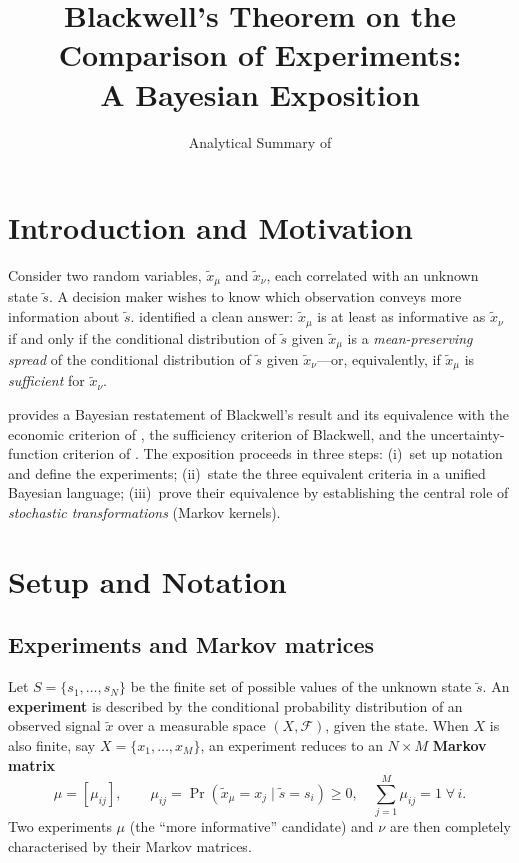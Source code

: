 \documentclass[12pt]{article}
\title{Blackwell's Theorem on the Comparison of Experiments:\\
       A Bayesian Exposition}
\author{Analytical Summary of \citet{kihlstrom1984}}
\date{}
\begin{document}
\maketitle
\tableofcontents
\bigskip

\section{Introduction and Motivation}

Consider two random variables, $\tilde{x}_\mu$ and $\tilde{x}_\nu$, each correlated
with an unknown state $\tilde{s}$.  A decision maker wishes to know which observation
conveys more information about $\tilde{s}$.  \citet{blackwell1951,blackwell1953}
identified a clean answer: $\tilde{x}_\mu$ is at least as informative as
$\tilde{x}_\nu$ if and only if the conditional distribution of $\tilde{s}$ given
$\tilde{x}_\mu$ is a \emph{mean-preserving spread} of the conditional distribution
of $\tilde{s}$ given $\tilde{x}_\nu$---or, equivalently, if $\tilde{x}_\mu$ is
\emph{sufficient} for $\tilde{x}_\nu$.

\citet{kihlstrom1984} provides a Bayesian restatement of Blackwell's result and
its equivalence with the economic criterion of \citet{bonnenblust1949}, the
sufficiency criterion of Blackwell, and the uncertainty-function criterion of
\citet{degroot1962}.  The exposition proceeds in three steps: (i)~set up notation
and define the experiments; (ii)~state the three equivalent criteria in a unified
Bayesian language; (iii)~prove their equivalence by establishing the central role
of \emph{stochastic transformations} (Markov kernels).

\section{Setup and Notation}

\subsection{Experiments and Markov matrices}

Let $S = \{s_1, \ldots, s_N\}$ be the finite set of possible values of the
unknown state $\tilde{s}$.  An \textbf{experiment} is described by the
conditional probability distribution of an observed signal $\tilde{x}$ over
a measurable space $(X, \mathscr{F})$, given the state.  When $X$ is also
finite, say $X = \{x_1, \ldots, x_M\}$, an experiment reduces to an
$N \times M$ \textbf{Markov matrix}
\[
\mu = [\mu_{ij}], \qquad
\mu_{ij} = \Pr(\tilde{x}_\mu = x_j \mid \tilde{s} = s_i) \geq 0,
\quad \sum_{j=1}^{M} \mu_{ij} = 1 \;\forall\, i.
\]
Two experiments $\mu$ (the ``more informative'' candidate) and $\nu$ are
then completely characterised by their Markov matrices.
\end{document}

